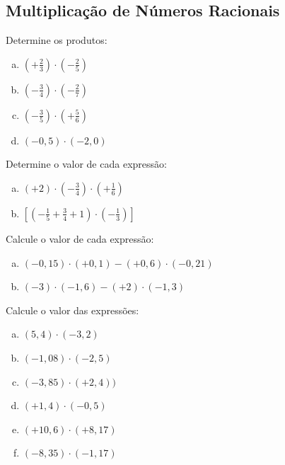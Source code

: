 \subsection{Multiplicação de Números Racionais}

\item Determine os produtos:
\begin{multicols}{4}
\begin{enumerate}[a)]
	\item $\displaystyle\left(+\frac{2}{3}\right)\cdot\left(-\frac{2}{5}\right)$
	\item $\displaystyle\left(-\frac{3}{4}\right)\cdot\left(-\frac{2}{7}\right)$
	\item $\displaystyle\left(-\frac{3}{5}\right)\cdot\left(+\frac{5}{6}\right)$
	\item $(-0,5)\cdot (-2,0)$
\end{enumerate}
\end{multicols}

\item Determine o valor de cada expressão:
\begin{multicols}{2}
\begin{enumerate}[a)]
	\item $(+2)\cdot \displaystyle\left(-\frac{3}{4}\right)\cdot \left(+\frac{1}{6}\right)$
	\item $\displaystyle\left[\left(-\frac{1}{5}+\frac{3}{4}+1\right)\cdot \left(-\frac{1}{3}\right)\right]$
\end{enumerate}
\end{multicols}

\item Calcule o valor de cada expressão:
\begin{multicols}{2}
\begin{enumerate}[a)]
	\item $(-0,15)\cdot (+0,1)-(+0,6)\cdot (-0,21)$
	\item $(-3)\cdot (-1,6) - (+2)\cdot (-1,3)$
\end{enumerate}
\end{multicols}

\item Calcule o valor das expressões:
\begin{multicols}{3}
\begin{enumerate}[a)]
	\item $(5,4)\cdot (-3,2)$
	\item $(-1,08)\cdot (-2,5)$
	\item $(-3,85)\cdot (+2,4))$
	\item $(+1,4)\cdot (-0,5)$
	\item $(+10,6)\cdot (+8,17)$
	\item $(-8,35)\cdot (-1,17)$
\end{enumerate}
\end{multicols}

